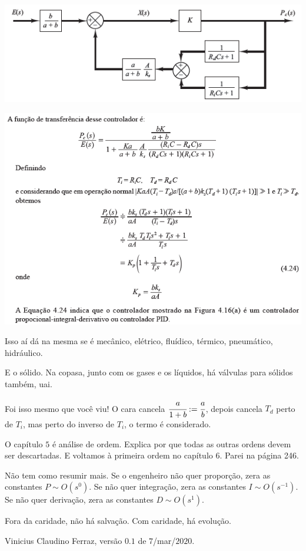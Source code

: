 \documentclass[12pt]{article}
\begin{document}
		\begin{center}
		\includegraphics{111}
		\end{center}

		\begin{center}
		\includegraphics{110}
		\end{center}

Isso a\'i d\'a na mesma se \'e mec\^anico, el\'etrico, flu\'idico, t\'ermico, pneum\'atico, hidr\'aulico.

E o s\'olido. Na copasa, junto com os gases e os l\'iquidos, h\'a v\'alvulas para s\'olidos tamb\'em, uai.

Foi isso mesmo que voc\^e viu! O cara cancela $\cfrac{a}{1 + b} := \cfrac{a}{b}$, depois cancela $T_d$ perto de $T_i$, mas perto do inverso de $T_i$, o termo \'e considerado.

O cap\'itulo $5$ \'e an\'alise de ordem. Explica por que todas as outras ordens devem ser descartadas. E voltamos \`a primeira ordem no cap\'itulo $6$. Parei na p\'agina 246.

N\~ao tem como resumir mais. Se o engenheiro n\~ao quer propor\c{c}\~ao, zera as constantes $P\sim O(s^0)$. Se n\~ao quer integra\c{c}\~ao, zera as constantes $I\sim O(s^{-1})$. Se n\~ao quer deriva\c{c}\~ao, zera as constantes $D\sim O(s^1)$.

\vspace{3mm}

Fora da caridade, n\~ao h\'a salva\c{c}\~ao. Com caridade, h\'a evolu\c{c}\~ao.

Vinicius Claudino Ferraz, vers\~ao $0.1$ de $7$/mar/$2020$.
\end{document}
